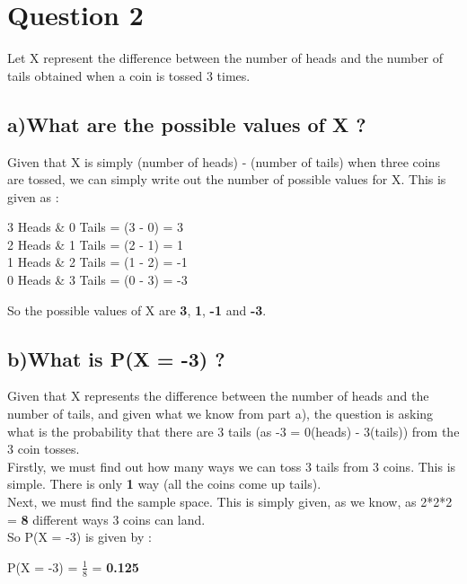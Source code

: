 \documentclass{report}
\begin{document}
		
		
		
				
	
	\section*{\hfil Question 2 \hfil}
    Let X represent the difference between the number of heads and the number of tails obtained when a coin is tossed 3 times.
        \subsection*{a)What are the possible values of X ?}
            Given that X is simply (number of heads) - (number of tails) when three coins are tossed, we can simply write out the number of possible values for X.
            This is given as : 

            \begin{center}
                3 Heads \& 0 Tails = (3 - 0) = 3\\
                2 Heads \& 1 Tails = (2 - 1) = 1\\
                1 Heads \& 2 Tails = (1 - 2) = -1\\
                0 Heads \& 3 Tails = (0 - 3) = -3\\
            \end{center}

            So the possible values of X are \textbf{3}, \textbf{1}, \textbf{-1} and \textbf{-3}.

        

        \subsection*{b)What is P(X = -3) ?}
            Given that X represents the difference between the number of heads and the number of tails, and given what we know from part a), the question is asking what is 
            the probability that there are 3 tails (as -3 = 0(heads) - 3(tails)) from the 3 coin tosses.\\
            Firstly, we must find out how many ways we can toss 3 tails from 3 coins. This is simple. There is only \textbf{1} way (all the coins come up tails).\\
            Next, we must find the sample space. This is simply given, as we know, as 2*2*2 = \textbf{8} different ways 3 coins can land.\\
            So P(X = -3) is given by : 

            \begin{center}
                P(X = -3) = $\frac{1}{8}$ = \textbf{0.125}
            \end{center}
\end{document}

